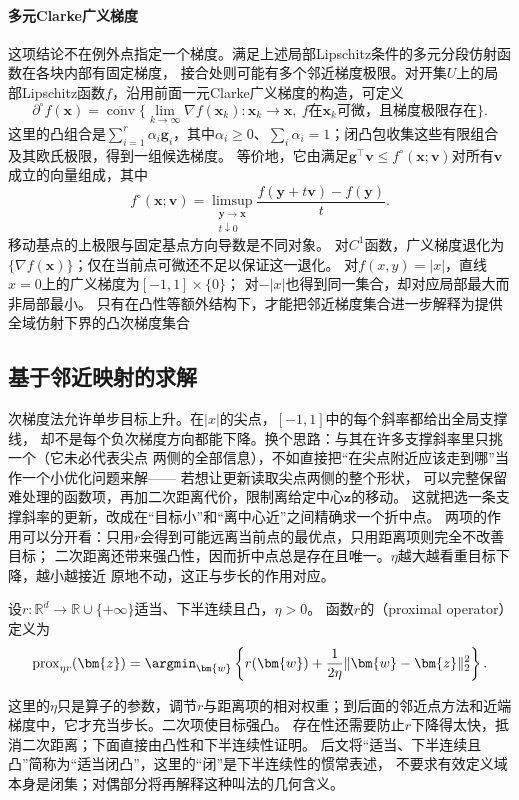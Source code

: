 \paragraph{多元Clarke广义梯度}

这项结论不在例外点指定一个梯度。满足上述局部Lipschitz条件的多元分段仿射函数在各块内部有固定梯度，
接合处则可能有多个邻近梯度极限。对开集$U$上的局部Lipschitz函数$f$，沿用前面一元Clarke广义梯度的构造，可定义
\[
 \partial^\circ f(\bm x)
 =\overline{\operatorname{conv}}\{
 \lim_{k\to\infty}\nabla f(\bm x_k):
 \bm x_k\to\bm x,\ f\text{在}\bm x_k\text{可微，且梯度极限存在}\}.
\]
这里的凸组合是$\sum_{i=1}^r\alpha_i\bm g_i$，其中$\alpha_i\geq0$、$\sum_i\alpha_i=1$；闭凸包收集这些有限组合及其欧氏极限，得到一组候选梯度。
等价地，它由满足$\bm g^\top\bm v\leq f^\circ(\bm x;\bm v)$对所有$\bm v$成立的向量组成，其中
\[
 f^\circ(\bm x;\bm v)
 =\limsup_{\substack{\bm y\to\bm x\\t\downarrow0}}
 \frac{f(\bm y+t\bm v)-f(\bm y)}t.
\]
移动基点的上极限与固定基点方向导数是不同对象。
对$C^1$函数，广义梯度退化为$\{\nabla f(\bm x)\}$；仅在当前点可微还不足以保证这一退化。
对$f(x,y)=|x|$，直线$x=0$上的广义梯度为$[-1,1]\times\{0\}$；
对$- |x|$也得到同一集合，却对应局部最大而非局部最小。
只有在凸性等额外结构下，才能把邻近梯度集合进一步解释为提供全域仿射下界的凸次梯度集合


\subsection{基于邻近映射的求解}
\label{sec:opt-nonsmooth-proximal}
\label{sec:opt-weaker-curvature}

次梯度法允许单步目标上升。在$|x|$的尖点，$[-1,1]$中的每个斜率都给出全局支撑线，
却不是每个负次梯度方向都能下降。换个思路：与其在许多支撑斜率里只挑一个（它未必代表尖点
两侧的全部信息），不如直接把“在尖点附近应该走到哪”当作一个小优化问题来解——
若想让更新读取尖点两侧的整个形状，
可以完整保留难处理的函数项，再加二次距离代价，限制离给定中心$\bm z$的移动。
这就把选一条支撑斜率的更新，改成在“目标小”和“离中心近”之间精确求一个折中点。
两项的作用可以分开看：只用$r$会得到可能远离当前点的最优点，只用距离项则完全不改善目标；
二次距离还带来强凸性，因而折中点总是存在且唯一。$\eta$越大越看重目标下降，越小越接近
原地不动，这正与步长的作用对应。
\begin{definition}[凸函数的邻近算子]
\label{def:opt-proximal-operator}
设$r:\mathbb R^d\to\mathbb R\cup\{+\infty\}$适当、下半连续且凸，$\eta>0$。
函数$r$的（proximal operator）定义为
\[
  \operatorname{prox}_{\eta r}(\bm{z})
  =\argmin_{\bm{w}}
  \left\{r(\bm{w})+\frac{1}{2\eta}
  \lVert\bm{w}-\bm{z}\rVert_2^2\right\}.
\]
\end{definition}
这里的$\eta$只是算子的参数，调节$r$与距离项的相对权重；到后面的邻近点方法和近端梯度中，它才充当步长。二次项使目标强凸。
存在性还需要防止$r$下降得太快，抵消二次距离；下面直接由凸性和下半连续性证明。
后文将“适当、下半连续且凸”简称为“适当闭凸”，这里的“闭”是下半连续性的惯常表述，
不要求有效定义域本身是闭集；对偶部分将再解释这种叫法的几何含义。

